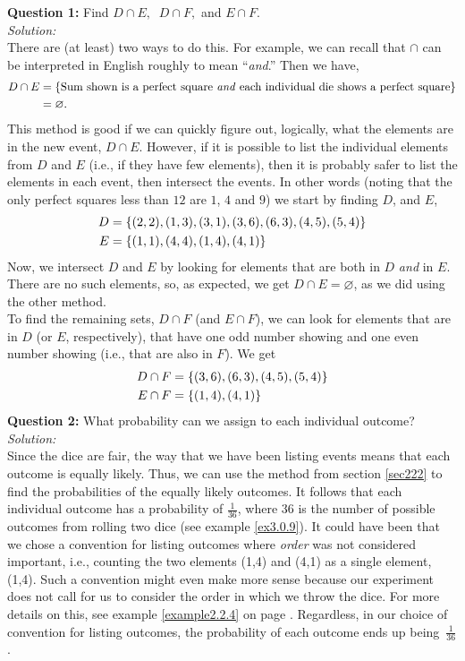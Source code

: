 \noindent\textbf{Question 1:} Find $D \cap E, \;\; D \cap F,$ and $E \cap F$. \\

\textit{Solution:} \\
There are (at least) two ways to do this. For example, we can recall that $\cap$ can be interpreted in English roughly to mean ``\textit{and}.'' Then we have,
\begin{align*}
D \cap E & = \left\{\text{Sum shown is a perfect square \textit{and} each individual die shows a perfect square}\right\} \\
              & =  \varnothing.
\end{align*}
This method is good if we can quickly figure out, logically, what the elements are in the new event, $D \cap E.$ However, if it is possible to list the individual elements from $D$ and $E$ (i.e., if they have few elements), then it is probably safer to list the elements in each event, then intersect the events. In other words (noting that the only perfect squares less than $12$ are $1$, $4$ and $9$) we start by finding $D$, and $E$,
\begin{align*}
D & = \left\{(2,2),(1,3),(3,1),(3,6),(6,3),(4,5),(5,4)\right\} \\
E & = \left\{(1,1),(4,4),(1,4),(4,1)\right\}
\end{align*}
Now, we intersect $D$ and $E$ by looking for elements that are both in $D$ \textit{and} in $E$. There are no such elements, so, as expected, we get $D \cap E = \varnothing$, as we did using the other method. \\

\noindent To find the remaining sets, $D \cap F$ (and $E \cap F$), we can look for elements that are in $D$ (or $E$, respectively), that have one odd number showing and one even number showing (i.e., that are also in $F$). We get
\begin{align*}
D \cap F & = \left\{(3,6),(6,3),(4,5),(5,4)\right\} \\
E \cap F & = \left\{(1,4),(4,1)\right\}
\end{align*}
\textbf{Question 2:} What probability can we assign to each individual outcome? \\

\noindent \textit{Solution:} \\
Since the dice are fair, the way that we have been listing events means that each outcome is equally likely. Thus, we can use the method from section \ref{sec222} to find the probabilities of the equally likely outcomes. It follows that each individual outcome has a probability of $\frac{1}{36}$, where 36 is the number of possible outcomes from rolling two dice (see example \ref{ex3.0.9}). It could have been that we chose a convention for listing outcomes where \textit{order} was not considered important, i.e., counting the two elements (1,4) and (4,1) as a single element, (1,4). Such a convention might even make more sense because our experiment does not call for us to consider the order in which we throw the dice. For more details on this, see example \ref{example2.2.4} on page  \pageref{example2.2.4}. Regardless, in our choice of convention for listing outcomes, the probability of each outcome ends up being~$\frac{1}{36}$. \\

